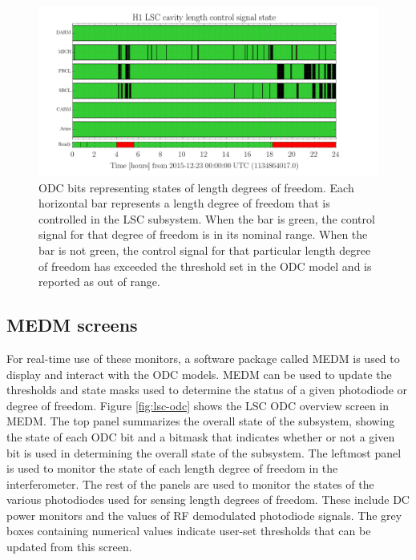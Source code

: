 \begin{figure}[ht!]
\includegraphics[width=\textwidth]{figures/ODC/LSC-bit-example}
\caption[LSC ODC bits example]{ODC bits representing states of length degrees of %
         freedom. Each horizontal bar represents a length degree of freedom that %
         is controlled in the LSC subsystem. When the bar is green, the control %
         signal for that degree of freedom is in its nominal range. When the %
         bar is not green, the control signal for that particular length degree %
         of freedom has exceeded the threshold set in the ODC model and is reported %
         as out of range.}
\label{fig:lsc-odc-bits}
\end{figure}

\subsection{MEDM screens}

For real-time use of these monitors, a software package called MEDM is used to 
display and interact with the ODC models. MEDM can be used to update the thresholds 
and state masks used to determine the status of a given photodiode or degree of 
freedom. 
Figure \ref{fig:lsc-odc} shows the LSC ODC overview screen in MEDM. 
The top panel summarizes the overall state of the subsystem, showing the state of 
each ODC bit and a bitmask that indicates whether or not a given bit is used in 
determining the overall state of the subsystem. 
The leftmost 
panel is used to monitor the state of each length degree of freedom in the interferometer. 
The rest of the panels are used to monitor the states of the various photodiodes used 
for sensing length degrees of freedom. These include DC power monitors and the values 
of RF demodulated photodiode signals. The grey boxes containing numerical values indicate 
user-set thresholds that can be updated from this screen.

